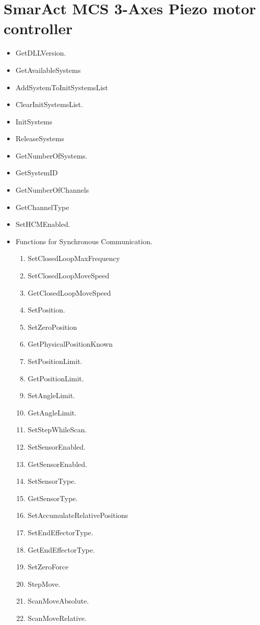 \documentclass[10pt,letter,twoside]{report}
\begin{document}
\section{SmarAct MCS 3-Axes Piezo motor controller}
\begin{itemize}
\item GetDLLVersion. 
\item GetAvailableSystems 
\item AddSystemToInitSystemsList 
\item ClearInitSystemsList. 
\item InitSystems 
\item ReleaseSystems 
\item GetNumberOfSystems. 
\item GetSystemID 
\item GetNumberOfChannels 
\item GetChannelType 
\item SetHCMEnabled. 
\item Functions for Synchronous Communication. 
\begin{enumerate}
\item SetClosedLoopMaxFrequency 
\item SetClosedLoopMoveSpeed 
\item GetClosedLoopMoveSpeed 
\item SetPosition. 
\item SetZeroPosition 
\item GetPhysicalPositionKnown 
\item SetPositionLimit. 
\item GetPositionLimit. 
\item SetAngleLimit. 
\item GetAngleLimit. 
\item SetStepWhileScan. 
\item SetSensorEnabled. 
\item GetSensorEnabled. 
\item SetSensorType. 
\item GetSensorType. 
\item SetAccumulateRelativePositions 
\item SetEndEffectorType. 
\item GetEndEffectorType. 
\item SetZeroForce 
\item StepMove. 
\item ScanMoveAbsolute. 
\item ScanMoveRelative. 

\end{enumerate}
\end{itemize}
\end{document}

